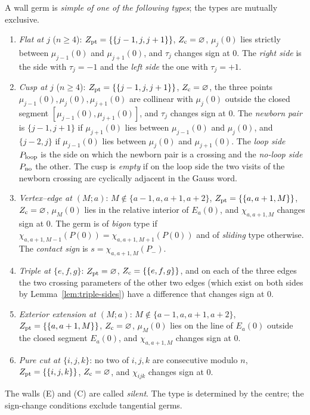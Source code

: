 \begin{definition}\label{def:walls}
A wall germ is \emph{simple of one of the following types}; the types are
mutually exclusive.
\begin{enumerate}
\item[(F)] \emph{Flat at $j$} ($n\geq4$): $Z_{\rm pt}=\{\{j-1,j,j+1\}\}$,
$Z_{\rm c}=\varnothing$, $\mu_j(0)$ lies strictly between $\mu_{j-1}(0)$ and
$\mu_{j+1}(0)$, and $\tau_j$ changes sign at $0$. The \emph{right side} is the
side with $\tau_j=-1$ and the \emph{left side} the one with $\tau_j=+1$.
\item[(K)] \emph{Cusp at $j$} ($n\geq4$): $Z_{\rm pt}=\{\{j-1,j,j+1\}\}$,
$Z_{\rm c}=\varnothing$, the three points $\mu_{j-1}(0),\mu_j(0),\mu_{j+1}(0)$
are collinear with $\mu_j(0)$ outside the closed segment
$[\mu_{j-1}(0),\mu_{j+1}(0)]$, and $\tau_j$ changes sign at $0$. The
\emph{newborn pair} is $\{j-1,j+1\}$ if $\mu_{j+1}(0)$ lies between
$\mu_{j-1}(0)$ and $\mu_j(0)$, and $\{j-2,j\}$ if $\mu_{j-1}(0)$ lies between
$\mu_j(0)$ and $\mu_{j+1}(0)$. The \emph{loop side} $P_{\rm loop}$ is the side
on which the newborn pair is a crossing and the \emph{no-loop side}
$P_{\rm no}$ the other. The cusp is
\emph{empty} if on the loop side the two visits of the newborn crossing are
cyclically adjacent in the Gauss word.
\item[(V)] \emph{Vertex--edge at $(M;a)$}: $M\notin\{a-1,a,a+1,a+2\}$,
$Z_{\rm pt}=\{\{a,a+1,M\}\}$, $Z_{\rm c}=\varnothing$, $\mu_M(0)$ lies in the
relative interior of $E_a(0)$, and $\chi_{a,a+1,M}$ changes sign at $0$. The
germ is of \emph{bigon} type if $\chi_{a,a+1,M-1}(P(0))=\chi_{a,a+1,M+1}(P(0))$
and of \emph{sliding} type otherwise. The \emph{contact sign} is
$s=\chi_{a,a+1,M}(P_-)$.
\item[(T)] \emph{Triple at $\{e,f,g\}$}: $Z_{\rm pt}=\varnothing$,
$Z_{\rm c}=\{\{e,f,g\}\}$, and on each of the three edges the two crossing
parameters of the other two edges (which exist on both sides by
Lemma~\ref{lem:triple-sides}) have a difference that changes sign at $0$.
\item[(E)] \emph{Exterior extension at $(M;a)$}: $M\notin\{a-1,a,a+1,a+2\}$,
$Z_{\rm pt}=\{\{a,a+1,M\}\}$, $Z_{\rm c}=\varnothing$, $\mu_M(0)$ lies on the
line of $E_a(0)$ outside the closed segment $E_a(0)$, and $\chi_{a,a+1,M}$
changes sign at $0$.
\item[(C)] \emph{Pure cut at $\{i,j,k\}$}: no two of $i,j,k$ are consecutive
modulo $n$, $Z_{\rm pt}=\{\{i,j,k\}\}$, $Z_{\rm c}=\varnothing$, and
$\chi_{ijk}$ changes sign at $0$.
\end{enumerate}
The walls (E) and (C) are called \emph{silent}. The type is determined by the
centre; the sign-change conditions exclude tangential germs.
\end{definition}

